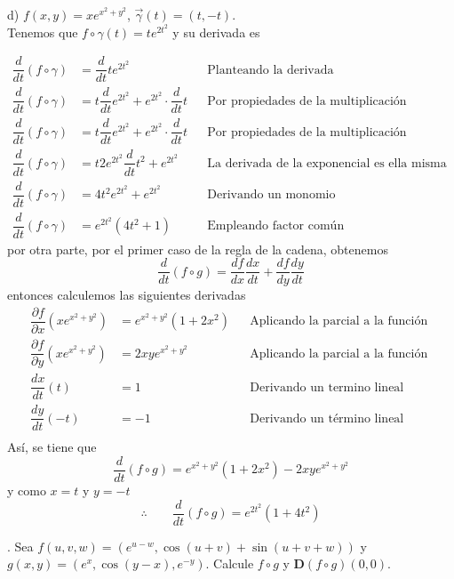 \documentclass[letterpaper]{article}
\renewcommand{\d}{\partial}
\renewcommand{\*}{\cdot}
\theoremstyle{definition}
\begin{document}
d) $f(x,y) = xe^{x^2 + y^2}$, $\vec{\gamma}(t) =(t, -t) $.\\

Tenemos que $  f \circ \gamma(t) = te^{2t^2}   $ y su derivada es 

\begin{align*}
\dfrac{d}{dt} (f\circ \gamma) &= \dfrac{d}{dt} te^{2t^2} &&\text{Planteando la derivada }\\
\dfrac{d}{dt} (f\circ \gamma) &= t\dfrac{d}{dt} e^{2t^2}+e^{2t^2}\*\dfrac{d}{dt} t &&\text{Por propiedades de la multiplicación }\\
\dfrac{d}{dt} (f\circ \gamma) &= t\dfrac{d}{dt} e^{2t^2}+e^{2t^2}\*\dfrac{d}{dt} t &&\text{Por propiedades de la multiplicación }\\
\dfrac{d}{dt} (f\circ \gamma) &= t2e^{2t^2}\dfrac{d}{dt}t^2 + e^{2t^2} &&\text{La derivada de la exponencial es ella misma por la derivada de su argumento}\\
\dfrac{d}{dt} (f\circ \gamma) &= 4t^2e^{2t^2} + e^{2t^2} &&\text{Derivando un monomio}\\
\dfrac{d}{dt} (f\circ \gamma) &= e^{2t^2}(4t^2 + 1) &&\text{Empleando factor común}
\end{align*}
por otra parte, por el primer caso de la regla de la cadena, obtenemos
\[ 	\dfrac{d}{dt}(f\circ g) = 	\dfrac{df}{dx}\dfrac{dx}{dt} + \dfrac{df}{dy}\dfrac{dy}{dt} \]
entonces calculemos las siguientes derivadas
\begin{align*}
\dfrac{\d f}{\d x}(xe^{x^2+y^2} ) &= e^{x^2+y^2}(1+2x^2)  &&\text{Aplicando la parcial a la función }\\
\dfrac{\d f}{\d y}(xe^{x^2+y^2}) &= 2xye^{x^2+y^2} &&\text{Aplicando la parcial a la función }\\
\dfrac{dx}{dt}(t) &= 1 &&\text{Derivando un termino lineal}\\
\dfrac{dy}{dt}(-t) &= -1 &&\text{Derivando un término lineal }\\
\end{align*}
Así, se tiene que 
\[ \dfrac{d}{dt}(f\circ g) = e^{x^2+y^2}(1+2x^2) -2xye^{x^2+y^2}  \] y como $ x = t  $ y $ y = -t $
\[ \therefore  \qquad \dfrac{d}{dt}(f\circ g) = e^{2t^2}(1+4t^2)  \]


. Sea $f(u, v, w) = (e^{u -w}, \cos{(u + v)} + \sin{(u + v + w)})$ y $g(x,y) = (e^{x}, \cos{(y - x)}, e^{-y} )$. Calcule $ f\circ g$ y $\mathbf{D}(f\circ g)(0,0)$.\\
\end{document}

